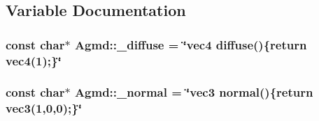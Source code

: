 \subsection{Variable Documentation}
\hypertarget{namespace_agmd_a7596e816d4f42240080bd1a7ca3cefcd}{
\subsubsection[{\+\_\+diffuse}]{\setlength{\rightskip}{0pt plus 5cm}const char$\ast$ Agmd\+::\+\_\+diffuse = \char`\"{}vec4 diffuse()\{return vec4(1);\}\char`\"{}}}\label{namespace_agmd_a7596e816d4f42240080bd1a7ca3cefcd}
\hypertarget{namespace_agmd_adc307fadfdf2fd84114167c39b310c86}{
\subsubsection[{\+\_\+normal}]{\setlength{\rightskip}{0pt plus 5cm}const char$\ast$ Agmd\+::\+\_\+normal = \char`\"{}vec3 normal()\{return vec3(1,0,0);\}\char`\"{}}}\label{namespace_agmd_adc307fadfdf2fd84114167c39b310c86}
